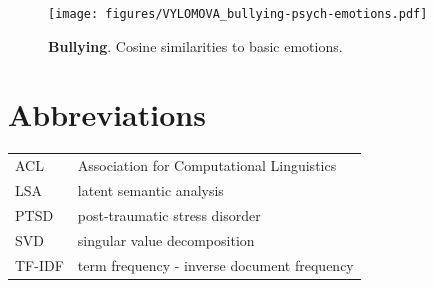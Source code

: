 \documentclass[output=paper]{langsci/langscibook}
\begin{document}
\begin{figure}
        \centering
        {\texttt{[image: figures/VYLOMOVA\_bullying-psych-emotions.pdf]}
        }\par\vfill
 \caption{\textbf{Bullying}. Cosine similarities to basic emotions.}
\label{fig:emotion-cos-sim-bullying}
\end{figure}
\fi 

\section*{Abbreviations}
\begin{tabularx}{\textwidth}{@{}lQ@{}}
ACL & Association for Computational Linguistics\\
LSA & latent semantic analysis\\
PTSD & post-traumatic stress disorder\\
SVD & singular value decomposition\\
TF-IDF & term frequency - inverse document frequency \\
\end{tabularx}

{\sloppy\printbibliography[heading=subbibliography,notkeyword=this]}
\end{document}
